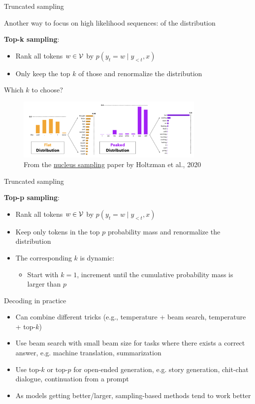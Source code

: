 \documentclass[usenames,dvipsnames,notes,11pt,aspectratio=169,hyperref={colorlinks=true, linkcolor=blue}]{beamer}
\begin{document}
\begin{frame}
    {Truncated sampling}

    Another way to focus on high likelihood sequences:  of the distribution

    \textbf{Top-k sampling}:\\
    \begin{itemize}
        \item Rank all tokens $w\in\mathcal{V}$ by $p(y_t=w\mid y_{<t},x)$
        \item Only keep the top $k$ of those and renormalize the distribution
    \end{itemize}

    \pause
    Which $k$ to choose?
    \vspace{-1em}
    \begin{figure}
        \includegraphics[height=3cm]{figures/dynamic-k}
        \caption{From the \href{https://arxiv.org/pdf/1904.09751.pdf}{nucleus sampling} paper by Holtzman et al., 2020}
    \end{figure}
\end{frame}

\begin{frame}
    {Truncated sampling}
    
    \textbf{Top-p sampling}:
    \begin{itemize}
        \item Rank all tokens $w\in\mathcal{V}$ by $p(y_t=w\mid y_{<t},x)$
        \item Keep only tokens in the top $p$ probability mass
            and renormalize the distribution
        \item The corresponding $k$ is dynamic:
            \begin{itemize}
            \item Start with $k=1$, increment until the cumulative probability mass is larger than $p$
            \end{itemize}
    \end{itemize}
\end{frame}

\begin{frame}
    {Decoding in practice}
    \begin{itemize}
        \item Can combine different tricks (e.g., temperature + beam search, temperature + top-$k$)
        \item Use beam search with small beam size for tasks where there exists a correct answer, e.g. machine translation, summarization
        \item Use top-$k$ or top-$p$ for open-ended generation, e.g. story generation, chit-chat dialogue, continuation from a prompt
        \item As models getting better/larger, sampling-based methods tend to work better
    \end{itemize}
\end{frame}
\end{document}
